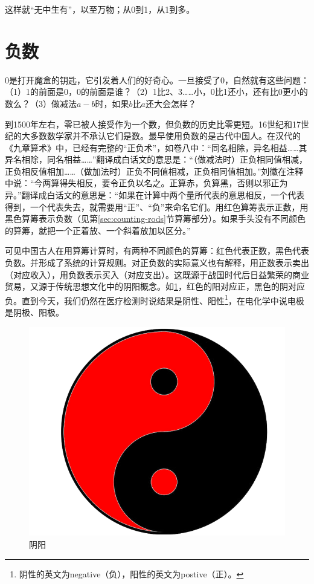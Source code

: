 \documentclass[b5paper]{ctexart}
\begin{document}
这样就“无中生有”，以至万物；从0到1，从1到多。

\section{负数}

0是打开魔盒的钥匙，它引发着人们的好奇心。一旦接受了0，自然就有这些问题：（1）1的前面是0，0的前面是谁？（2）1比2、3……小，0比1还小，还有比0更小的数么？（3）做减法$a -b$时，如果$b$比$a$还大会怎样？

  
到1500年左右，零已被人接受作为一个数，但负数的历史比零更短。16世纪和17世纪的大多数数学家并不承认它们是数。最早使用负数的是古代中国人。在汉代的《九章算术》中，已经有完整的“正负术”，如卷八中：“同名相除，异名相益……其异名相除，同名相益……”翻译成白话文的意思是：“（做减法时）正负相同值相减，正负相反值相加……（做加法时）正负不同值相减，正负相同值相加。”刘徽在注释中说：“今两算得失相反，要令正负以名之。正算赤，负算黑，否则以邪正为异。”翻译成白话文的意思是：“如果在计算中两个量所代表的意思相反，一个代表得到，一个代表失去，就需要用“正”、“负”来命名它们。用红色算筹表示正数，用黑色算筹表示负数（见第\ref{sec:counting-rods}节算筹部分）。如果手头没有不同颜色的算筹，就把一个正着放、一个斜着放加以区分。”\cite{Jiuzhang-2009}

可见中国古人在用算筹计算时，有两种不同颜色的算筹：红色代表正数，黑色代表负数。并形成了系统的计算规则。对正负数的实际意义也有解释，用正数表示卖出（对应收入），用负数表示买入（对应支出）。这既源于战国时代后日益繁荣的商业贸易，又源于传统思想文化中的阴阳概念。如\cref{fig:yinyang}，红色的阳对应正，黑色的阴对应负。直到今天，我们仍然在医疗检测时说结果是阴性、阳性\footnote{阴性的英文为negative（负），阳性的英文为postive（正）。}，在电化学中说电极是阴极、阳极。

\begin{figure}[htbp]
 \centering
 \includegraphics[scale=0.1]{img/yinyang}
 \caption{阴阳}
 \label{fig:yinyang}
\end{figure}
\end{document}
